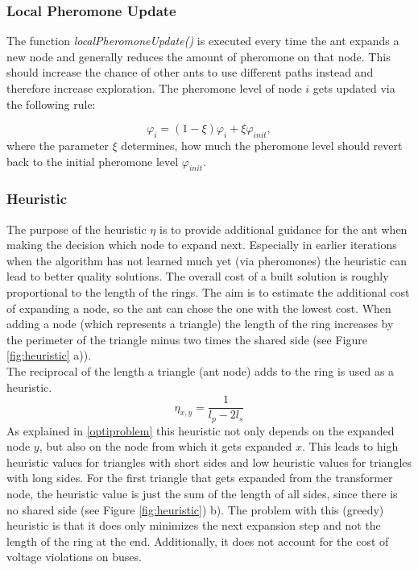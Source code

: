 \subsubsection{Local Pheromone Update}
The function \textit{localPheromoneUpdate()} is executed every time the ant expands a new node and generally reduces the amount of pheromone on that node. This should increase the chance of other ants to use different paths instead and therefore increase exploration. The pheromone level of node $i$ gets updated via the following rule:

$$\varphi_i = (1-\xi)\varphi_i + \xi \varphi_{init},$$
where the parameter $\xi$ determines, how much the pheromone level should revert back to the initial pheromone level $\varphi_{init}$. 
\subsubsection{Heuristic}
The purpose of the heuristic $\eta$ is to provide additional guidance for the ant when making the decision which node to expand next. Especially in earlier iterations when the algorithm has not learned much yet (via pheromones) the heuristic can lead to better quality solutions. The overall cost of a built solution is roughly proportional to the length of the rings. The aim is to estimate the additional cost of expanding a node, so the ant can chose the one with the lowest cost. When adding a node (which represents a triangle) the length of the ring increases by the perimeter of the triangle minus two times the shared side (see Figure \ref{fig:heuristic} a)).
 \\
The reciprocal of the length a triangle (ant node) adds to the ring is used as a heuristic.
$$\eta_{x,y} = \frac{1}{l_{p} - 2l_{s}}$$
As explained in \ref{optiproblem} this heuristic not only depends on the expanded node $y$, but also on the node from which it gets expanded $x$. This leads to high heuristic values for triangles with short sides and low heuristic values for triangles with long sides. For the first triangle that gets expanded from the transformer node, the heuristic value is just the sum of the length of all sides, since there is no shared side (see Figure \ref{fig:heuristic}) b). The problem with this (greedy) heuristic is that it does only minimizes the next expansion step and not the length of the ring at the end. Additionally, it does not account for the cost of voltage violations on buses.

